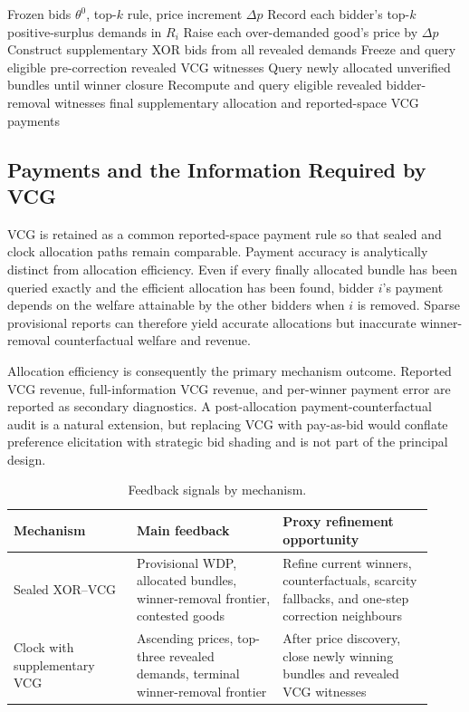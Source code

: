 \begin{algorithm}[htbp]
\caption{Clock price discovery and terminal revealed-winner verification}
\label{alg:clock}
\begin{algorithmic}[1]
\Require Frozen bids \(\theta^0\), top-\(k\) rule, price increment \(\Delta p\)
    \State Record each bidder's top-\(k\) positive-surplus demands in \(R_i\)
    \State Raise each over-demanded good's price by \(\Delta p\)
\EndWhile
\State Construct supplementary XOR bids from all revealed demands
\State Freeze and query eligible pre-correction revealed VCG witnesses
\Repeat
    \State Query newly allocated unverified bundles until winner closure
    \State Recompute and query eligible revealed bidder-removal witnesses
\State \Return final supplementary allocation and reported-space VCG payments
\end{algorithmic}
\end{algorithm}

\subsection{Payments and the Information Required by VCG}

VCG is retained as a common reported-space payment rule so that sealed and
clock allocation paths remain comparable. Payment accuracy is analytically
distinct from allocation efficiency. Even if every finally allocated bundle
has been queried exactly and the efficient allocation has been found, bidder
\(i\)'s payment depends on the welfare attainable by the other bidders when
\(i\) is removed. Sparse provisional reports can therefore yield accurate
allocations but inaccurate winner-removal counterfactual welfare and revenue.

Allocation efficiency is consequently the primary mechanism outcome.
Reported VCG revenue, full-information VCG revenue, and per-winner payment
error are reported as secondary diagnostics. A post-allocation
payment-counterfactual audit is a natural extension, but replacing VCG with
pay-as-bid would conflate preference elicitation with strategic bid shading
and is not part of the principal design.

\begin{table}[ht]
\centering
\caption{Feedback signals by mechanism.}
\label{tab:mechanism-feedback}
\begin{tabular}{p{0.27\linewidth}p{0.32\linewidth}p{0.33\linewidth}}
\toprule
Mechanism & Main feedback & Proxy refinement opportunity \\
\midrule
Sealed XOR--VCG & Provisional WDP, allocated bundles, winner-removal frontier, contested goods & Refine current winners, counterfactuals, scarcity fallbacks, and one-step correction neighbours \\
Clock with supplementary VCG & Ascending prices, top-three revealed demands, terminal winner-removal frontier & After price discovery, close newly winning bundles and revealed VCG witnesses \\
\bottomrule
\end{tabular}
\end{table}


